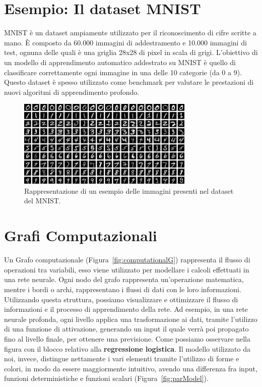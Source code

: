\section{Esempio: Il dataset MNIST}
MNIST è un dataset ampiamente utilizzato per il riconoscimento di cifre scritte a mano. È composto da 60.000 immagini di addestramento e 10.000 immagini di test, ognuna delle quali è una griglia 28x28 di pixel in scala di grigi. L'obiettivo di un modello di apprendimento automatico addestrato su MNIST è quello di classificare correttamente ogni immagine in una delle 10 categorie (da 0 a 9). Questo dataset è spesso utilizzato come benchmark per valutare le prestazioni di nuovi algoritmi di apprendimento profondo.
\\
\begin{figure}[h]
    \centering
    \includegraphics[width=0.75\textwidth]{figure/MNIST_dataset_example.png}
    \caption{Rappresentazione di un esempio delle immagini presenti nel dataset del MNIST.}
\end{figure}

\section{Grafi Computazionali}
Un Grafo computazionale (Figura~\ref{fig:computationalG}) rappresenta il flusso di operazioni tra variabili, esso viene utilizzato per modellare i calcoli effettuati in una rete neurale. Ogni nodo del grafo rappresenta un'operazione matematica, mentre i bordi o archi, rappresentano i flussi di dati con le loro informazioni. Utilizzando questa struttura, possiamo visualizzare e ottimizzare il flusso di informazioni e il processo di apprendimento della rete. Ad esempio, in una rete neurale profonda, ogni livello applica una trasformazione ai dati, tramite l'utilizzo di una funzione di attivazione, generando un input il quale verrà poi propagato fino al livello finale, per ottenere una previsione. Come possiamo osservare nella figura con il blocco relativo alla \textbf{regressione logistica}. Il modello utilizzato da noi, invece, distingue nettamente i vari elementi tramite l'utilizzo di forme e colori, in modo da essere maggiormente intuitivo, avendo una differenza fra input, funzioni deterministiche e funzioni scalari (Figura~\ref{fig:parModel}).


